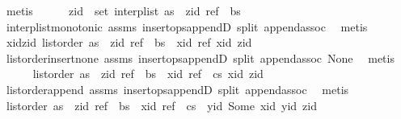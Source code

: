 \begin{isabellebody}
\ metis\isanewline
\ \ \ \ \isamarkupfalse%
\ {\isachardoublequoteopen}zid\ {\isasymin}\ set\ {\isacharparenleft}interp{\isacharunderscore}list\ {\isacharparenleft}as\ {\isacharat}\ {\isacharbrackleft}{\isacharparenleft}zid{\isacharcomma}\ ref{\isacharparenright}{\isacharbrackright}\ {\isacharat}\ bs{\isacharparenright}{\isacharparenright}{\isachardoublequoteclose}\isanewline
\ \ \ \ \ \ \isamarkupfalse%
\ interp{\isacharunderscore}list{\isacharunderscore}monotonic\ assms{\isacharparenleft}{}{\isacharparenright}\ insert{\isacharunderscore}ops{\isacharunderscore}appendD\ split\ append{\isachardot}assoc\ \isamarkupfalse%
\ metis\isanewline
\ \ \ \ \isamarkupfalse%
\ xid{\isacharunderscore}zid{\isacharcolon}\ {\isachardoublequoteopen}list{\isacharunderscore}order\ {\isacharparenleft}as\ {\isacharat}\ {\isacharbrackleft}{\isacharparenleft}zid{\isacharcomma}\ ref{\isacharparenright}{\isacharbrackright}\ {\isacharat}\ bs\ {\isacharat}\ {\isacharbrackleft}{\isacharparenleft}xid{\isacharcomma}\ ref{\isacharparenright}{\isacharbrackright}{\isacharparenright}\ xid\ zid{\isachardoublequoteclose}\isanewline
\ \ \ \ \ \ \isamarkupfalse%
\ list{\isacharunderscore}order{\isacharunderscore}insert{\isacharunderscore}none\ assms{\isacharparenleft}{}{\isacharparenright}\ insert{\isacharunderscore}ops{\isacharunderscore}appendD\ split\ append{\isachardot}assoc\ None\ \isamarkupfalse%
\ metis\isanewline
\ \ \ \ \isamarkupfalse%
\ {\isachardoublequoteopen}list{\isacharunderscore}order\ {\isacharparenleft}as\ {\isacharat}\ {\isacharbrackleft}{\isacharparenleft}zid{\isacharcomma}\ ref{\isacharparenright}{\isacharbrackright}\ {\isacharat}\ bs\ {\isacharat}\ {\isacharbrackleft}{\isacharparenleft}xid{\isacharcomma}\ ref{\isacharparenright}{\isacharbrackright}\ {\isacharat}\ cs{\isacharparenright}\ xid\ zid{\isachardoublequoteclose}\isanewline
\ \ \ \ \ \ \isamarkupfalse%
\ list{\isacharunderscore}order{\isacharunderscore}append\ assms{\isacharparenleft}{}{\isacharparenright}\ insert{\isacharunderscore}ops{\isacharunderscore}appendD\ split\ append{\isachardot}assoc\ \isamarkupfalse%
\ metis\isanewline
\ \ \ \ \isamarkupfalse%
\ {\isachardoublequoteopen}list{\isacharunderscore}order\ {\isacharparenleft}as\ {\isacharat}\ {\isacharbrackleft}{\isacharparenleft}zid{\isacharcomma}\ ref{\isacharparenright}{\isacharbrackright}\ {\isacharat}\ bs\ {\isacharat}\ {\isacharbrackleft}{\isacharparenleft}xid{\isacharcomma}\ ref{\isacharparenright}{\isacharbrackright}\ {\isacharat}\ cs\ {\isacharat}\ {\isacharbrackleft}{\isacharparenleft}yid{\isacharcomma}\ Some\ xid{\isacharparenright}{\isacharbrackright}{\isacharparenright}\ yid\ zid{\isachardoublequoteclose}\isanewline

\end{isabellebody}
